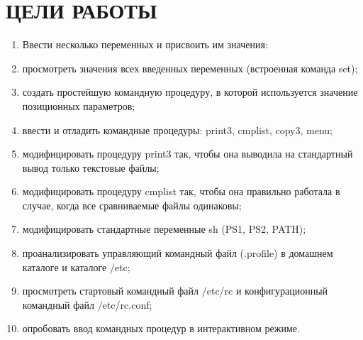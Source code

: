 \documentclass[a4paper,14pt]{article}
\begin{document}


\section{ЦЕЛИ РАБОТЫ}

\begin{enumerate}
\item Ввести несколько переменных и присвоить им значения:
	{\small }
\item просмотреть значения всех введенных переменных (встроенная команда set);
	{\small }
\item создать простейшую командную процедуру, в которой используется значение позиционных параметров;
	{\small }
\item ввести и отладить командные процедуры: print3, cmplist, copy3, menu;
\item модифицировать процедуру print3 так, чтобы она выводила на стандартный вывод только текстовые файлы;
\item модифицировать процедуру cmplist так, чтобы она правильно работала в случае, когда все сравниваемые файлы одинаковы;
\item модифицировать стандартные переменные sh (PS1, PS2, PATH);
\item проанализировать управляющий командный файл (.profile) в домашнем каталоге и каталоге /etc;
\item просмотреть стартовый командный файл /etc/rc и конфигурационный командный файл /etc/rc.conf;
\item опробовать ввод командных процедур в интерактивном режиме.

\end{enumerate}
\end{document}

